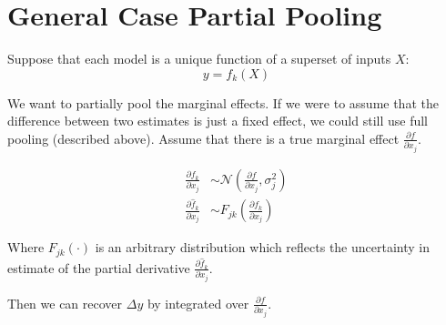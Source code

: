 \documentclass[]{article}
\begin{document}
\section{General Case Partial Pooling}

Suppose that each model is a unique function of a superset of inputs $X$:
\[
y = f_k(X)
\]

We want to partially pool the marginal effects.  If we were to assume that the difference between two estimates is just a fixed effect, we could still use full pooling (described above).  Assume that there is a true marginal effect $\frac{\partial f}{\partial x_j}$.

\begin{align*}
\frac{\partial f_k}{\partial x_j} &\sim \mathcal{N}(\frac{\partial f}{\partial x_j}, \sigma_j^2) \\
\frac{\partial \hat{f}_k}{\partial x_j} &\sim F_{jk}(\frac{\partial f_k}{\partial x_j})
\end{align*}

Where $F_{jk}(\cdot)$ is an arbitrary distribution which reflects the uncertainty in estimate of the partial derivative $\frac{\partial \hat{f}_k}{\partial x_j}$.

Then we can recover $\Delta y$ by integrated over $\frac{\partial f}{\partial x_j}$.
\end{document}
